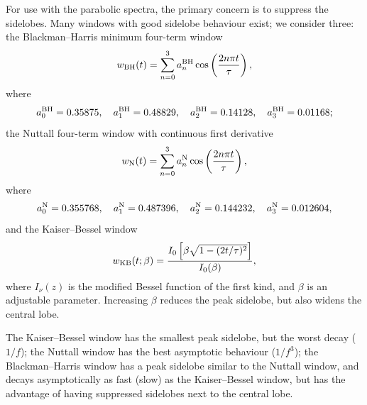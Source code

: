 For use with the parabolic spectra, the primary concern is to suppress the sidelobes. Many windows with good sidelobe behaviour exist; we consider three: the Blackman--Harris minimum four-term window \citep{Harris1978, Nuttall1981}
\begin{equation}
w_\mathrm{BH}(t) = \sum_{n=0}^{3} a^\mathrm{BH}_n\cos\left(\dfrac{2n\pi t}{\tau}\right),
\end{equation}
where
\begin{equation}
a^\mathrm{BH}_0 = 0.35875, \quad a^\mathrm{BH}_1 = 0.48829, \quad
a^\mathrm{BH}_2 = 0.14128, \quad a^\mathrm{BH}_3 = 0.01168;
\end{equation}
the Nuttall four-term window with continuous first derivative \citep{Nuttall1981}
\begin{equation}
w_\mathrm{N}(t) = \sum_{n=0}^{3} a^\mathrm{N}_n\cos\left(\dfrac{2n\pi t}{\tau}\right),
\end{equation}
where
\begin{equation}
a^\mathrm{N}_0 = 0.355768, \quad a^\mathrm{N}_1 = 0.487396, \quad
a^\mathrm{N}_2 = 0.144232, \quad a^\mathrm{N}_3 = 0.012604,
\end{equation}
and the Kaiser--Bessel window \citep{Harris1978, Kaiser1980}
\begin{equation}
w_\mathrm{KB}(t;\beta) = \dfrac{I_0\left[\beta\sqrt{1 - (2 t/\tau)^2}\right]}{I_0(\beta)},
\end{equation}
where $I_\nu(z)$ is the modified Bessel function of the first kind, and $\beta$ is an adjustable parameter. Increasing $\beta$ reduces the peak sidelobe, but also widens the central lobe.

The Kaiser--Bessel window has the smallest peak sidelobe, but the worst decay ($1/f$); the Nuttall window has the best asymptotic behaviour ($1/f^3$); the Blackman--Harris window has a peak sidelobe similar to the Nuttall window, and decays asymptotically as fast (slow) as the Kaiser--Bessel window, but has the advantage of having suppressed sidelobes next to the central lobe.

